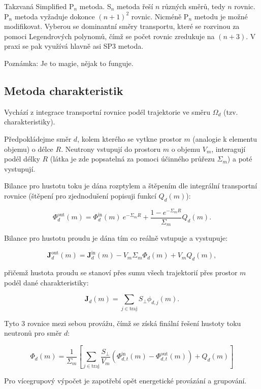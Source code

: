 Takzvaná Simplified P$_n$ metoda. S$_n$ metoda řeší $n$ různých směrů, tedy $n$ rovnic. P$_n$ metoda vyžaduje dokonce $(n+1)^2$ rovnic. Nicméně P$_n$ metodu je možné modifikovat. Vyberou se dominantní směry transportu, které se rozvinou za pomoci Legendrových polynomů, čímž se počet rovnic zredukuje na $(n+3)$. V praxi se pak využívá hlavně asi SP3 metoda.

Poznámka: Je to magie, nějak to funguje. 

\subsection{Metoda charakteristik}

Vychází z integrace transportní rovnice podél trajektorie ve směru $\Omega_d$ (tzv. charakteristiky). 

Předpokládejme směr $d$, kolem kterého se vytkne prostor $m$ (analogie k elementu objemu) o délce $R$. Neutrony vstupují do prostoru $m$ o objemu $V_m$, interagují podél délky $R$ (látka je zde popsatelná za pomoci účinného průřezu $\Sigma_m$) a poté vystupují. 

Bilance pro hustotu toku je dána rozptylem a štěpením dle integrální transportní rovnice (štěpení pro zjednodušení popisuji funkcí $Q_d(m)$):

$$ \Phi_d^\text{out}(m) = \Phi_d^\text{in}(m) \: e^{-\Sigma_m R} + \dfrac{1 - e^{-\Sigma_m R}}{\Sigma_m} Q_d(m). $$

Bilance pro hustotu proudu je dána tím co reálně vstupuje a vystupuje:

$$ \textbf{J}_d^\text{out}(m) = \textbf{J}_d^\text{in}(m) - V_m \Sigma_m \Phi_d(m) + V_m Q_d(m), $$

přičemž hustota proudu se stanoví přes sumu všech trajektorií přes prostor $m$ podél dané charakteristiky:

$$ \textbf{J}_d (m) = \sum_{j \in \text{traj}} S_\perp \phi_{d,j}(m). $$

Tyto 3 rovnice mezi sebou provážu, čímž se získá finální řešení hustoty toku neutronů pro směr $d$:

$$ \Phi_d(m) = \dfrac{1}{\Sigma_m} \left[ \sum_{j \in \text{traj}} \dfrac{S_\perp}{V_m} \left( \Phi_{d,t}^\text{in}(m) - \Phi_{d,t}^\text{out}(m) \right) + Q_d(m) \right] $$

Pro vícegrupový výpočet je zapotřebí opět energetické provázání a grupování.